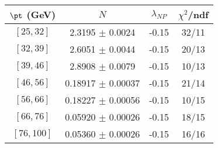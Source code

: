 \begin{tabular}{c||c|c|c}
$\pt$ (GeV) & $N$ & $\lambda_{NP}$ & $\chi^2$/ndf  \\
\hline
$[25, 32]$ & 2.3195 $\pm$ 0.0024 & -0.15 & 32/11\\
$[32, 39]$ & 2.6051 $\pm$ 0.0044 & -0.15 & 20/13\\
$[39, 46]$ & 2.8908 $\pm$ 0.0079 & -0.15 & 10/13\\
$[46, 56]$ & 0.18917 $\pm$ 0.00037 & -0.15 & 21/14\\
$[56, 66]$ & 0.18227 $\pm$ 0.00056 & -0.15 & 10/15\\
$[66, 76]$ & 0.05920 $\pm$ 0.00026 & -0.15 & 18/15\\
$[76, 100]$ & 0.05360 $\pm$ 0.00026 & -0.15 & 16/16\\
\end{tabular}
